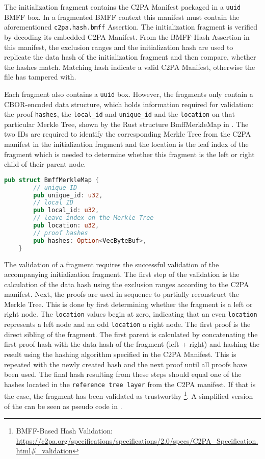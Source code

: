 The initialization fragment contains the C2PA Manifest packaged in a \texttt{uuid} BMFF box. In a fragmented BMFF context this manifest must contain the aforementioned \texttt{c2pa.hash.bmff} Assertion. The initialization fragment is verified by decoding its embedded C2PA Manifest. From the BMFF Hash Assertion in this manifest, the exclusion ranges and the initialization hash are used to replicate the data hash of the initialization fragment and then compare, whether the hashes match. Matching hash indicate a valid C2PA Manifest, otherwise the file has tampered with.

Each fragment also contains a \texttt{uuid} box. However, the fragments only contain a CBOR-encoded \cite{rfc8949} data structure, which holds information required for validation: the proof \texttt{hashes}, the \texttt{local\_id} and \texttt{unique\_id} and the \texttt{location} on that particular Merkle Tree, shown by the Rust structure BmffMerkleMap in . The two IDs are required to identify the corresponding Merkle Tree from the C2PA manifest in the initialization fragment and the location is the leaf index of the fragment which is needed to determine whether this fragment is the left or right child of their parent node.

\begin{minipage}{0.95\linewidth}
\begin{lstlisting}[caption={BmffMerkleMap Rust Definition}, label=code:bmff_merkle, language=Rust, captionpos=b]
    pub struct BmffMerkleMap {
        // unique ID
        pub unique_id: u32,
        // local ID
        pub local_id: u32,
        // leave index on the Merkle Tree
        pub location: u32,
        // proof hashes
        pub hashes: Option<VecByteBuf>,
    }
\end{lstlisting}
\end{minipage}

The validation of a fragment requires the successful validation of the accompanying initialization fragment. The first step of the validation is the calculation of the data hash using the exclusion ranges according to the C2PA manifest. Next, the proofs are used in sequence to partially reconstruct the Merkle Tree. This is done by first determining whether the fragment is a left or right node. The \texttt{location} values begin at zero, indicating that an even \texttt{location} represents a left node and an odd \texttt{location} a right node. The first proof is the direct sibling of the fragment. The first parent is calculated by concatenating the first proof hash with the data hash of the fragment (left + right) and hashing the result using the hashing algorithm specified in the C2PA Manifest. This is repeated with the newly created hash and the next proof until all proofs have been used. The final hash resulting from these steps should equal one of the hashes located in the \texttt{reference tree layer} from the C2PA manifest. If that is the case, the fragment has been validated as trustworthy \footnote{BMFF-Based Hash Validation: \url{https://c2pa.org/specifications/specifications/2.0/specs/C2PA_Specification.html\#_validation}}. A simplified version of the can be seen as pseudo code in .

